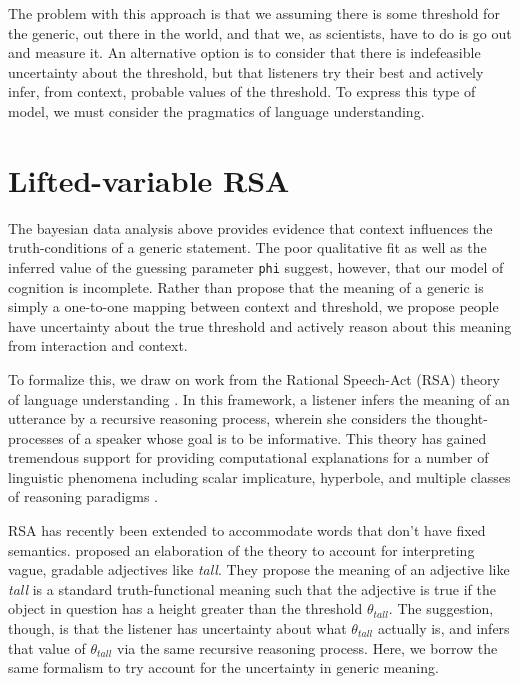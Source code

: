 \documentclass[10pt,letterpaper]{article}
\begin{document}
The problem with this approach is that we assuming there is some threshold for the generic, out there in the world, and that we, as scientists, have to do is go out and measure it. An alternative option is to consider that there is indefeasible uncertainty about the threshold, but that listeners try their best and actively infer, from context, probable values of the threshold. To express this type of model, we must consider the pragmatics of language understanding. 


\section{Lifted-variable RSA}

The bayesian data analysis above provides evidence that context influences the truth-conditions of a generic statement. The poor qualitative fit as well as the inferred value of the guessing parameter \lstinline{phi} suggest, however, that our model of cognition is incomplete. Rather than propose that the meaning of a generic is simply a one-to-one mapping between context and threshold, we propose people have uncertainty about the true threshold and actively reason about this meaning from interaction and context. 

To formalize this, we draw on work from the Rational Speech-Act (RSA) theory of language understanding \cite{Frank2012}. In this framework, a listener infers the meaning of an utterance by a recursive reasoning process, wherein she considers the thought-processes of a speaker whose goal is to be informative. This theory has gained tremendous support for providing computational explanations for a number of linguistic phenomena including scalar implicature, hyperbole, and multiple classes of reasoning paradigms \cite{Goodman2013, Kao2014, Tessler2014, Lassiter2014}. 

RSA has recently been extended to accommodate words that don't have fixed semantics.  proposed an elaboration of the theory to account for interpreting vague, gradable adjectives like \emph{tall}. They propose the meaning of an adjective like \emph{tall} is a standard truth-functional meaning such that the adjective is true if the object in question has a height greater than the threshold $\theta_{tall}$. The suggestion, though, is that the listener has uncertainty about what $\theta_{tall}$ actually is, and infers that value of $\theta_{tall}$ via the same recursive reasoning process. Here, we borrow the same formalism to try account for the uncertainty in generic meaning.
\end{document}
